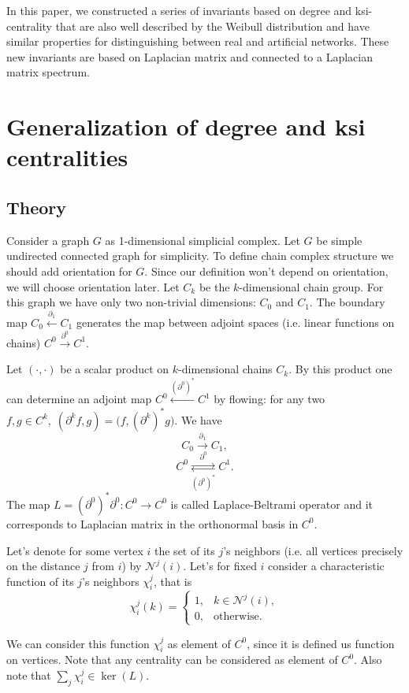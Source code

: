\documentclass[12pt, a4paper]{extarticle}
\def \cN {\mathcal{N}}
\def \d {\partial}
\begin{document}
In this paper, we constructed a series of invariants based on degree and ksi-centrality that are also well described by the Weibull distribution and have similar properties for distinguishing between real and artificial networks. These new invariants are based on Laplacian matrix and connected to a Laplacian matrix spectrum.

\section{Generalization of degree and ksi centralities}

\subsection{Theory}

Consider a graph $G$ as 1-dimensional simplicial complex. Let $G$ be simple undirected connected graph for simplicity. To define chain complex structure we should add orientation for $G$. Since our definition won't depend on orientation, we will choose orientation later. Let $C_k$ be the $k$-dimensional chain group. For this graph we have only two non-trivial dimensions: $C_0$ and $C_1$. The boundary map $C_0\xleftarrow{\d_1} C_1$ generates the map between adjoint spaces (i.e. linear functions on chains) $C^0\xrightarrow{\d^0} C^1$.

Let $(\cdot, \cdot)$ be a scalar product on $k$-dimensional chains $C_k$. By this product one can determine an adjoint map $C^0\xleftarrow{(\d^0)^*} C^1$ by flowing: for any two $f,g\in C^k,\; (\d^kf,g) = \big(f,(\d^k)^* g\big)$. We have
$$
C_0\xrightarrow{\d_1} C_1,
$$
$$
C^0\underset{(\d^0)^*}{\overset{\d^0}{\rightleftarrows}} C^1.
$$
The map $L = (\d^0)^*\d^0:C^0\rightarrow C^0$ is called Laplace-Beltrami operator and it corresponds to Laplacian matrix in the orthonormal basis in $C^0$.

Let's denote for some vertex $i$ the set of its $j$'s neighbors (i.e. all vertices precisely on the distance $j$ from $i$) by $\cN^j(i)$. Let's for fixed $i$ consider a characteristic function of its $j$'s neighbors $\chi^j_i$, that is 
$$
    \chi^j_i(k) = \begin{cases}
        1, & k\in \cN^j(i), \\
        0, & \text{otherwise.}
    \end{cases}
$$

We can consider this function $\chi^j_i$ as element of $C^0$, since it is defined us function on vertices. Note that any centrality can be considered as element of $C^0$. Also note that $\sum_j \chi^j_i\in \ker(L)$.
\end{document}
